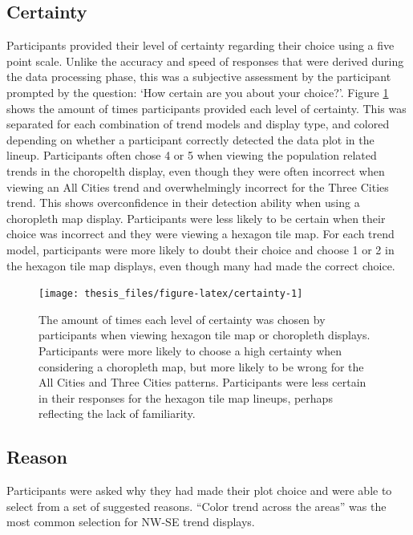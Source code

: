 \documentclass{monashthesis}
\begin{document}
\hypertarget{certainty}{%
\subsection{Certainty}\label{certainty}}

Participants provided their level of certainty regarding their choice using a five point scale.
Unlike the accuracy and speed of responses that were derived during the data processing phase, this was a subjective
assessment by the participant prompted by the question: `How certain are you about your choice?'.
Figure \ref{fig:certainty} shows the amount of times participants provided each level of certainty. This was separated for each combination of trend models and display type, and colored depending on whether a participant correctly detected the data plot in the lineup.
Participants often chose 4 or 5 when viewing the population related trends in the choropelth display, even though they were often incorrect when viewing an All Cities trend and overwhelmingly incorrect for the Three Cities trend. This shows overconfidence in their detection ability when using a choropleth map display. Participants were less likely to be certain when their choice was incorrect and they were viewing a hexagon tile map.
For each trend model, participants were more likely to doubt their choice and choose 1 or 2 in the hexagon tile map displays, even though many had made the correct choice.

\begin{figure}

{\centering \texttt{[image: thesis\_files/figure-latex/certainty-1]} 

}

\caption{The amount of times each level of certainty was chosen by participants when viewing hexagon tile map or choropleth displays. Participants were more likely to choose a high certainty when considering a choropleth map, but more likely to be wrong for the All Cities and Three Cities patterns. Participants were less certain in their responses for the hexagon tile map lineups, perhaps reflecting the lack of familiarity.}\label{fig:certainty}
\end{figure}

\hypertarget{reason}{%
\subsection{Reason}\label{reason}}

Participants were asked why they had made their plot choice and were able to select from a set of suggested reasons.
``Color trend across the areas'' was the most common selection for NW-SE trend displays.
\end{document}
